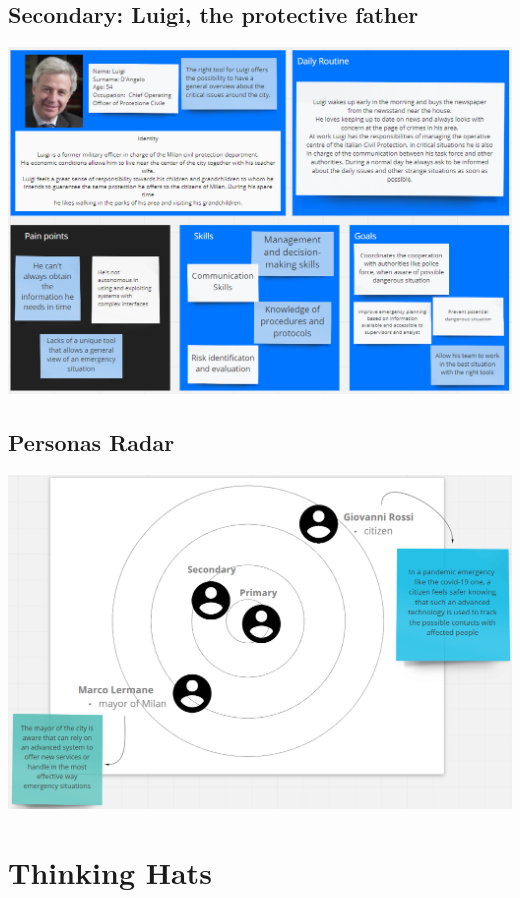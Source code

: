 \documentclass[../main.tex]{subfiles}
\begin{document}
    \section{Secondary: Luigi, the protective father}\label{sec:secondary-persona}
    \includegraphics[scale = 0.45]{assets/secondary.png}
    \section{Personas Radar}\label{sec:personas-radar}

    \includegraphics[scale = 0.5]{assets/radar.jpg}

    \chapter{Thinking Hats}\label{ch:thinking-hats}
\end{document}

